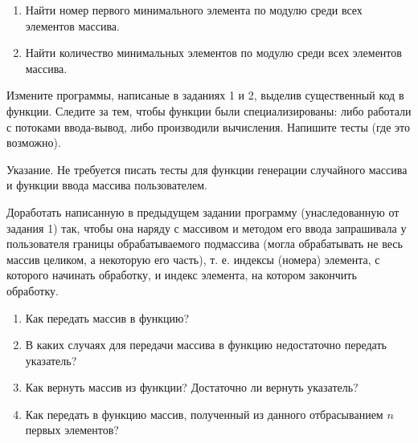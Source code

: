 \begin{enumerate}

	\item Найти номер первого минимального элемента по модулю среди всех элементов массива.

	\item Найти количество минимальных элементов по модулю среди всех элементов массива.

\end{enumerate}


\labtask

Измените программы, написаные в заданиях 1 и 2, выделив существенный код в функции.
Следите за тем, чтобы функции были специализированы: либо работали с потоками ввода-вывод, либо производили вычисления.
Напишите тесты (где это возможно).

Указание. Не требуется писать тесты для функции генерации случайного массива и функции ввода массива пользователем. 

\labtask

Доработать написанную в предыдущем задании программу (унаследованную от задания 1) так, чтобы она наряду с массивом и методом его ввода запрашивала у пользователя границы обрабатываемого подмассива (могла обрабатывать не весь массив целиком, а некоторую его часть), т. е. индексы (номера) элемента, с которого начинать обработку, и индекс элемента, на котором закончить обработку.

\labworkquestions

\begin{enumerate}

	\item
		Как передать массив в функцию?
	\item
		В каких случаях для передачи массива в функцию недостаточно передать указатель?
	\item
		Как вернуть массив из функции? Достаточно ли вернуть указатель?
	\item
		Как передать в функцию массив, полученный из данного отбрасыванием $n$ первых элементов?
\end{enumerate}



